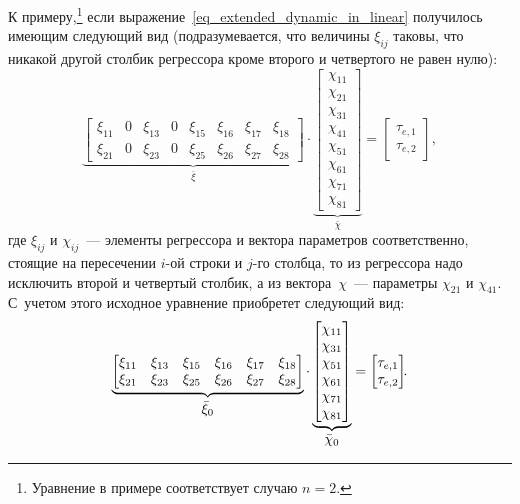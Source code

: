 К примеру\lefteqn,\footnote{Уравнение в примере соответствует случаю $n=2$.} если выражение~\eqref{eq_extended_dynamic_in_linear} получилось имеющим следующий вид (подразумевается, что величины $\xi_{ij}$ таковы, что никакой другой столбик регрессора кроме второго и четвертого не равен нулю):
\begin{equation}
    \underbrace{
        \begin{bmatrix}
            \xi_{11} & 0 & \xi_{13} & 0 & \xi_{15} & \xi_{16} & \xi_{17} & \xi_{18}\\
            \xi_{21} & 0 & \xi_{23} & 0 & \xi_{25} & \xi_{26} & \xi_{27} & \xi_{28}
        \end{bmatrix}
    }_{\displaystyle \bar\xi}
    \cdot
    \underbrace{
        \begin{bmatrix}
            \chi_{11} \\ \chi_{21} \\ \chi_{31} \\ \chi_{41} \\ \chi_{51} \\ \chi_{61} \\ \chi_{71} \\ \chi_{81}
        \end{bmatrix}
    }_{\displaystyle \bar\chi}
    =
    \begin{bmatrix}
        \tau_{e,1} \\ \tau_{e,2}
    \end{bmatrix}\!\!,
\end{equation}
где $\xi_{ij}$ и $\chi_{ij}$~--- элементы регрессора и вектора параметров соответственно, стоящие на пересечении $i$-ой строки и $j$-го столбца, то из регрессора надо исключить второй и четвертый столбик, а из вектора~$\chi$~--- параметры $\chi_{21}$ и $\chi_{41}$.
С~учетом этого исходное уравнение приобретет следующий вид:
\begin{equation}\label{eq_regr_without_zeros}
    \underbrace{
        \begin{bmatrix}
            \xi_{11} & \xi_{13} & \xi_{15} & \xi_{16} & \xi_{17} & \xi_{18}\\
            \xi_{21} & \xi_{23} & \xi_{25} & \xi_{26} & \xi_{27} & \xi_{28}
        \end{bmatrix}
    }_{\displaystyle \bar\xi_0}
    \cdot
    \underbrace{
        \begin{bmatrix}
            \chi_{11} \\ \chi_{31} \\ \chi_{51} \\ \chi_{61} \\ \chi_{71} \\ \chi_{81}
        \end{bmatrix}
    }_{\displaystyle \bar\chi_0}
    =
    \begin{bmatrix}
        \tau_{e,1} \\ \tau_{e,2}
    \end{bmatrix}\!\!\ldotp
\end{equation}

